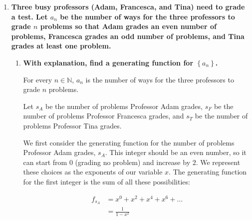 \documentclass[10pt]{article}
\begin{document}
\begin{enumerate}
Let $S = \binom{n}{1}+3\binom{n}{3}+5\binom{n}{5}+\cdots \, = \, 2\binom{n}{2}+4\binom{n}{4}+6\binom{n}{6}+\cdots$. Then we have 

\begin{align*}
    2S &= \binom{n}{1}+2\binom{n}{2}+3\binom{n}{3}+4\binom{n}{4} + 5\binom{n}{5}+\cdots\\
    &= n\binom{n-1}{0}+n\binom{n-1}{1}+n\binom{n-1}{2}+n\binom{n-1}{3}+ n\binom{n-1}{4}+\cdots\\
    &= n \left[ \binom{n-1}{0}+\binom{n-1}{1}+\binom{n-1}{2}+\binom{n-1}{3}+ \binom{n-1}{4}+\cdots \right]\\
    &= n \times 2^{n-1}\\
    S&= n \times 2^{n-2}
\end{align*}

Therefore, we have the sum on each side of the equation is $n \times 2^{n-2}$.

{\footnotesize \it HINT: One approach (for both (a) and (b)) would be to play around with the Binomial Theorem.}

\vskip 1in  %

\item
\textbf{Three busy professors (Adam, Francesca, and Tina) need to grade a test.  Let $a_n$ be the number of ways for the three professors to grade $n$ problems so that Adam grades an even number of problems, Francesca grades an odd number of problems, and Tina grades at least one problem.}
\begin{enumerate}
\item
\textbf{With explanation, find a generating function for $\left\{a_n\right\}$.}

For every $n \in \mathbb{N}$, $a_n$ is the number of ways for the three professors to grade $n$ problems.

Let $s_A$ be the number of problems Professor Adam grades, $s_F$ be the number of problems Professor Francesca grades, and $s_T$ be the number of problems Professor Tina grades.

We first consider the generating function for the number of problems Professor Adam grades, $s_A$. This integer should be an even number, so it can start from $0$ (grading no problem) and increase by $2$. We represent these choices as the exponents of our variable $x$. The generating function for the first integer is the sum of all these possibilities:

\begin{align*}
f_{s_A} &= x^0 + x^2 + x^4 + x^6 + \ldots  \\
    &= \frac{1}{1-x^2} \\
\end{align*}


\end{enumerate}
\end{enumerate}
\end{document}
